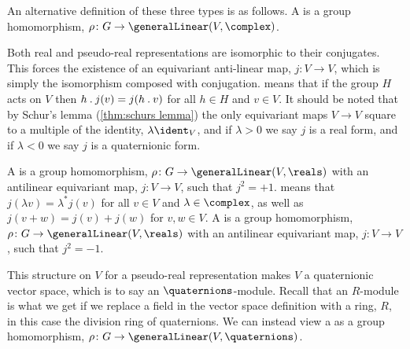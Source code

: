 An alternative definition of these three types is as follows.
A  is a group homomorphism, \(\rho
\colon G \to \generalLinear(V, \complex)\).

Both real and pseudo-real representations are isomorphic to their
conjugates.
This forces the existence of an equivariant anti-linear map, \(j \colon V
\to V\), which is simply the isomorphism composed with conjugation.
 means that if the group \(H\) acts
on \(V\) then \(h\mathbin{.} j(v) = j(h\mathbin{.} v)\) for all \(h \in H\) and \(v \in
V\).
It should be noted that by Schur's lemma (\cref{thm:schurs lemma}) the only
equivariant maps \(V \to V\) square to a multiple of the identity,
\(\lambda\ident_V\), and if \(\lambda > 0\) we say \(j\) is a real form, and if
\(\lambda < 0\) we say \(j\) is a quaternionic form.

A  is a group homomorphism, \(\rho \colon G
\to \generalLinear(V, \reals)\) with an antilinear equivariant map, \(j \colon V
\to V\), such that \(j^2 = +1\).
 means that \(j(\lambda v) = \lambda^*
j(v)\) for all \(v\in V\) and \(\lambda \in \complex\), as well as \(j(v + w) =
j(v) + j(w)\) for \(v, w \in V\).
A  is a group homomorphism, \(\rho
\colon G \to \generalLinear(V, \reals)\) with an antilinear equivariant map, \(j
\colon V \to V\), such that \(j^2 = -1\).

This structure on \(V\) for a pseudo-real representation makes \(V\) a
quaternionic vector space, which is to say an \(\quaternions\)-module.
Recall that an \(R\)-module is what we get if we replace a field in the
vector space definition with a ring, \(R\), in this case the division ring of
quaternions.
We can instead view a  as a group
homomorphism, \(\rho \colon G \to \generalLinear(V, \quaternions)\).

